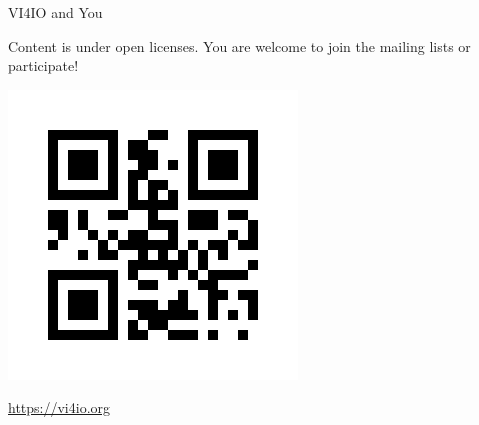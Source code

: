 \documentclass[portrait,a0paper,fontscale=0.4]{baposter}
\begin{document}
\begin{poster}
\begin{posterbox}[name=hpccertification,column=3,below=b4, above=bottom]{VI4IO and You}
\begin{minipage}{0.7\textwidth}
Content is under open licenses.
You are welcome to join the mailing lists or participate!
\end{minipage}
\begin{minipage}{0.29\textwidth}
\includegraphics[width=\textwidth]{qr-code.jpg}
\end{minipage}

\vspace*{-0.5em}


\huge \url{https://vi4io.org}
\end{posterbox}


\end{poster}
\end{document}
